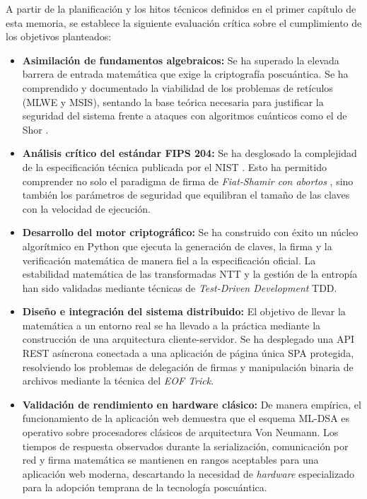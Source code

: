 \documentclass[11pt, a4paper]{report}
\theoremstyle{definition}
\begin{document}
A partir de la planificación y los hitos técnicos definidos en el primer capítulo de esta memoria, se establece la siguiente evaluación crítica sobre el cumplimiento de los objetivos planteados:

\begin{itemize}
    \item \textbf{Asimilación de fundamentos algebraicos:} Se ha superado la elevada barrera de entrada matemática que exige la criptografía poscuántica. Se ha comprendido y documentado la viabilidad de los problemas de retículos (MLWE y MSIS), sentando la base teórica necesaria para justificar la seguridad del sistema frente a ataques con algoritmos cuánticos como el de Shor \cite{shor1994}.
    
    \item \textbf{Análisis crítico del estándar FIPS 204:} Se ha desglosado la complejidad de la especificación técnica publicada por el NIST \cite{nist_fips204}. Esto ha permitido comprender no solo el paradigma de firma de \textit{Fiat-Shamir con abortos} \cite{lyubashevsky2009fiat}, sino también los parámetros de seguridad que equilibran el tamaño de las claves con la velocidad de ejecución.
    
    \item \textbf{Desarrollo del motor criptográfico:} Se ha construido con éxito un núcleo algorítmico en Python que ejecuta la generación de claves, la firma y la verificación matemática de manera fiel a la especificación oficial. La estabilidad matemática de las transformadas NTT y la gestión de la entropía han sido validadas mediante técnicas de \textit{Test-Driven Development} TDD.
    
    \item \textbf{Diseño e integración del sistema distribuido:} El objetivo de llevar la matemática a un entorno real se ha llevado a la práctica mediante la construcción de una arquitectura cliente-servidor. Se ha desplegado una API REST asíncrona conectada a una aplicación de página única SPA protegida, resolviendo los problemas de delegación de firmas y manipulación binaria de archivos mediante la técnica del \textit{EOF Trick}.
    
    \item \textbf{Validación de rendimiento en hardware clásico:} De manera empírica, el funcionamiento de la aplicación web demuestra que el esquema ML-DSA es operativo sobre procesadores clásicos de arquitectura Von Neumann. Los tiempos de respuesta observados durante la serialización, comunicación por red y firma matemática se mantienen en rangos aceptables para una aplicación web moderna, descartando la necesidad de \textit{hardware} especializado para la adopción temprana de la tecnología poscuántica.
\end{itemize}
\end{document}
